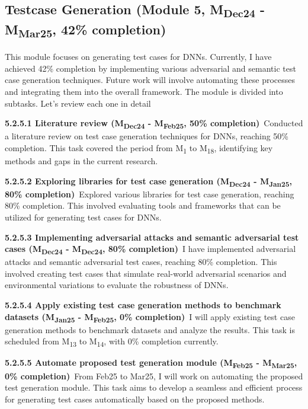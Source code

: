 \subsection{Testcase Generation (Module 5, M\textsubscript{Dec24} - M\textsubscript{Mar25}, 42\% completion)} This module focuses on generating test cases for DNNs. Currently, I have achieved 42\% completion by implementing various adversarial and semantic test case generation techniques. Future work will involve automating these processes and integrating them into the overall framework. The module is divided into subtasks. Let's review each one in detail

\noindent \textbf{5.2.5.1 Literature review (M\textsubscript{Dec24} - M\textsubscript{Feb25}, 50\% completion)}\ Conducted a literature review on test case generation techniques for DNNs, reaching 50\% completion. This task covered the period from M\textsubscript{1} to M\textsubscript{18}, identifying key methods and gaps in the current research.

\noindent \textbf{5.2.5.2 Exploring libraries for test case generation (M\textsubscript{Dec24} - M\textsubscript{Jan25}, 80\% completion)}\ Explored various libraries for test case generation, reaching 80\% completion. This involved evaluating tools and frameworks that can be utilized for generating test cases for DNNs.

\noindent \textbf{5.2.5.3 Implementing adversarial attacks and semantic adversarial test cases (M\textsubscript{Dec24} - M\textsubscript{Dec24}, 80\% completion)}\ I have implemented adversarial attacks and semantic adversarial test cases, reaching 80\% completion. This involved creating test cases that simulate real-world adversarial scenarios and environmental variations to evaluate the robustness of DNNs.

\noindent \textbf{5.2.5.4 Apply existing test case generation methods to benchmark datasets (M\textsubscript{Jan25} - M\textsubscript{Feb25}, 0\% completion)}\ I will apply existing test case generation methods to benchmark datasets and analyze the results. This task is scheduled from M\textsubscript{13} to M\textsubscript{14}, with 0\% completion currently.

\noindent \textbf{5.2.5.5 Automate proposed test generation module (M\textsubscript{Feb25} - M\textsubscript{Mar25}, 0\% completion)}\ From Feb25 to Mar25, I will work on automating the proposed test generation module. This task aims to develop a seamless and efficient process for generating test cases automatically based on the proposed methods.

